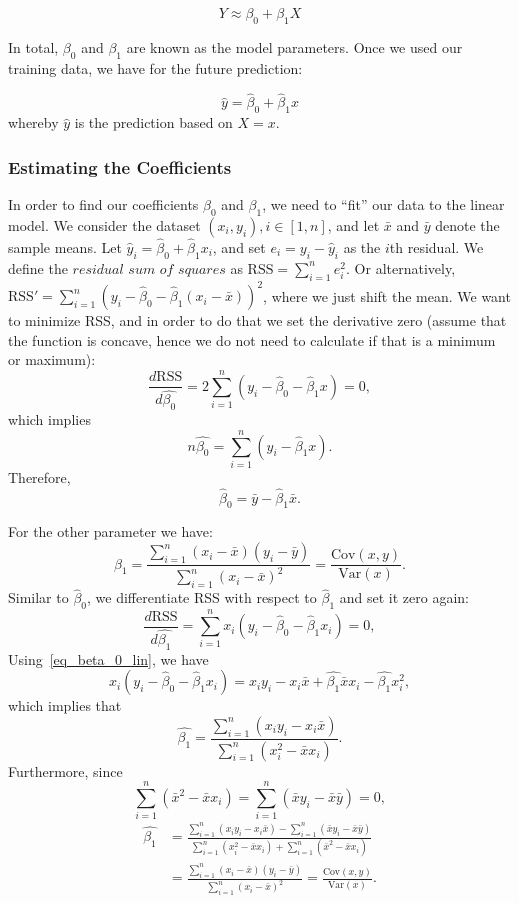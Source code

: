 \documentclass{article}
\begin{document}
$$ Y \approx \beta_0 + \beta_1 X $$

In total, $\beta_0$ and $\beta_1$ are known as the model parameters. Once we used our training data, we have for the future prediction:

$$ \hat y =\hat \beta_0 + \hat \beta_1 x $$
whereby $\hat y$ is the prediction based on $X=x$.

\subsubsection{ Estimating the Coefficients}


In order to find our coefficients $\beta_0$ and $\beta_1$, we need to ``fit''
our data to the linear model. We consider the dataset $(x_i,y_i), i \in [1,n]$,
and let $\bar x$ and $ \bar y$ denote the sample means.
Let $\hat y_i =\hat \beta_0 + \hat \beta_1 x_i $, and set $e_i=y_i - \hat y _i$
as the $i$th residual. We define the $\textit{residual sum of squares}$ as
$\text{RSS} = \sum_{i=1}^n e_i^2$. Or alternatively, $\text{RSS}' = \sum_{i=1}^n
(y_i - \hat\beta_0-\hat\beta_1(x_i-\bar x))^2$, where we just shift the mean. We
want to minimize RSS,  and in order to do that we set the derivative zero
(assume that the function is concave, hence we do not need to calculate if that
is a minimum or maximum):
 \[
 \frac{d \text{RSS}}{d\hat{\beta_0}} =    2 \sum_{i=1}^n (y_i -
 \hat\beta_0-\hat\beta_1x) =0,  
\]
which implies
\[
    n\hat{\beta_0} =  \sum_{i=1}^n (y_i -\hat\beta_1x).
\]
Therefore, 
\begin{equation}\label{eq_beta_0_lin}
 \hat \beta _0 = \bar y - \hat \beta _1 \bar x.
\end{equation}

For the other parameter we have:
\begin{equation}
\hat \beta _1 = \frac{\sum_{i=1}^n(x_i-\bar x)(y_i - \bar y)}{\sum_{i=1}^n(x_i - \bar x)^2}=\frac{\text{Cov}(x,y)}{\text{Var}(x)}. 
\end{equation}
Similar to $\hat{\beta}_0$, we differentiate RSS with respect to $\hat{\beta}_1$ and set it zero again:
\[
       \frac{d \text{RSS}}{d\hat{\beta_1}}=   \sum_{i=1}^n x_i(y_i -
       \hat\beta_0-\hat\beta_1 x_i) =0,
\]
Using~\eqref{eq_beta_0_lin}, we have 
\[
  x_i(y_i -
       \hat\beta_0-\hat\beta_1 x_i) = x_iy_i - x_i\bar{x}+\hat{\beta_1}\bar{x}x_i -\hat{\beta_1}x_i^2,
     \]
     which implies that
     \[
     \hat{\beta_1}=\frac{\sum_{i=1}^n (x_iy_i-x_i \bar{x}) }{\sum_{i=1}^n (x_i^2-\bar{x}x_i) }. 
     \]
     Furthermore, since
     \[
       \sum_{i=1}^n (\bar{x}^2-\bar{x}x_i) = \sum_{i=1}^n (\bar{x}y_i-\bar{x}\bar{y})=0,
     \]
\begin{align*}
        \hat{\beta_1} & = \frac{\sum_{i=1}^n (x_iy_i-x_i \bar{x}) -\sum_{i=1}^n (\bar{x}y_i-\bar{x}\bar{y}) }{\sum_{i=1}^n (x_i^2-\bar{x}x_i) +\sum_{i=1}^n (\bar{x}^2-\bar{x}x_i) }\\
       & = \frac{\sum_{i=1}^n (x_i-\bar{x})(y_i-\bar{y})}{\sum_{i=1}^n (x_i-\bar{x})^2}=\frac{\text{Cov}(x,y)}{\text{Var}(x)}. 
\end{align*}
\end{document}
